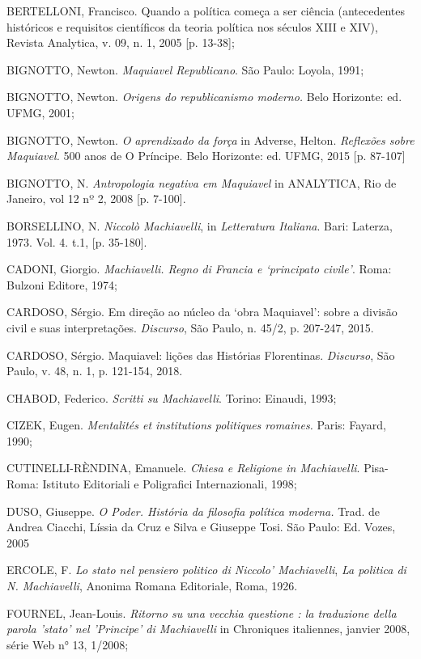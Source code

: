 BERTELLONI, Francisco. Quando a política começa a ser ciência
(antecedentes históricos e requisitos científicos da teoria política nos
séculos XIII e XIV), Revista Analytica, v. 09, n. 1, 2005 {[}p.
13-38{]};

BIGNOTTO, Newton. \emph{Maquiavel Republicano}. São Paulo: Loyola, 1991;

BIGNOTTO, Newton. \emph{Origens do republicanismo moderno.} Belo
Horizonte: ed. UFMG, 2001;

BIGNOTTO, Newton. \emph{O aprendizado da força} in Adverse, Helton.
\emph{Reflexões sobre Maquiavel.} 500 anos de O Príncipe. Belo
Horizonte: ed. UFMG, 2015 {[}p. 87-107{]}

BIGNOTTO, N. \emph{Antropologia negativa em Maquiavel} in ANALYTICA, Rio
de Janeiro, vol 12 nº 2, 2008 {[}p. 7-100{]}.

BORSELLINO, N. \emph{Niccolò Machiavelli}, in \emph{Letteratura
Italiana}. Bari: Laterza, 1973. Vol. 4. t.1, {[}p. 35-180{]}.

CADONI, Giorgio. \emph{Machiavelli. Regno di Francia e `principato
civile'}. Roma: Bulzoni Editore, 1974;

CARDOSO, Sérgio. Em direção ao núcleo da `obra Maquiavel': sobre a
divisão civil e suas interpretações. \emph{Discurso}, São Paulo, n.
45/2, p. 207-247, 2015.

CARDOSO, Sérgio. Maquiavel: lições das Histórias Florentinas.
\emph{Discurso}, São Paulo, v. 48, n. 1, p. 121-154, 2018.

CHABOD, Federico. \emph{Scritti su Machiavelli}. Torino: Einaudi, 1993;

CIZEK, Eugen. \emph{Mentalités et institutions politiques romaines.}
Paris: Fayard, 1990;

CUTINELLI-RÈNDINA, Emanuele. \emph{Chiesa e Religione in Machiavelli}.
Pisa-Roma: Istituto Editoriali e Poligrafici Internazionali, 1998;

DUSO, Giuseppe. \emph{O Poder. História da filosofia política moderna.}
Trad. de Andrea Ciacchi, Líssia da Cruz e Silva e Giuseppe Tosi. São
Paulo: Ed. Vozes, 2005

ERCOLE, F. \emph{Lo stato nel pensiero politico di Niccolo'
Machiavelli}, \emph{La politica di N. Machiavelli}, Anonima Romana
Editoriale, Roma, 1926.

FOURNEL, Jean-Louis. \emph{Ritorno su una vecchia questione : la
traduzione della parola 'stato' nel 'Principe' di Machiavelli} in
Chroniques italiennes, janvier 2008, série Web n° 13, 1/2008;

